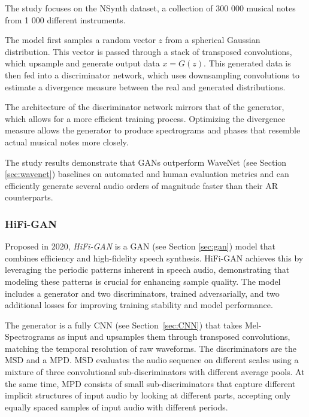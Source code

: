 The study focuses on the NSynth \cite{engel_neural_2017} dataset, a collection of 300 000 musical notes from 1 000 different instruments.

The model first samples a random vector $z$ from a spherical Gaussian distribution. This vector is passed through a stack of transposed convolutions, which upsample and generate output data $x = G(z)$. This generated data is then fed into a discriminator network, which uses downsampling convolutions to estimate a divergence measure between the real and generated distributions.

The architecture of the discriminator network mirrors that of the generator, which allows for a more efficient training process. Optimizing the divergence measure allows the generator to produce spectrograms and phases that resemble actual musical notes more closely.

The study results demonstrate that \acp{GAN} outperform WaveNet (see Section \ref{sec:wavenet}) baselines on automated and human evaluation metrics and can efficiently generate several audio orders of magnitude faster than their \ac{AR} counterparts.


\subsubsection{HiFi-GAN}

Proposed in 2020, \textit{HiFi-GAN} \cite{kong_hifi-gan_2020} is a \ac{GAN} (see Section \ref{sec:gan}) model that combines efficiency and high-fidelity speech synthesis. HiFi-GAN achieves this by leveraging the periodic patterns inherent in speech audio, demonstrating that modeling these patterns is crucial for enhancing sample quality. The model includes a generator and two discriminators, trained adversarially, and two additional losses for improving training stability and model performance.

The generator is a fully \ac{CNN} (see Section~\ref{sec:CNN}) that takes Mel-Spectrograms as input and upsamples them through transposed convolutions, matching the temporal resolution of raw waveforms. The discriminators are the \ac{MSD} and a \ac{MPD}. \Ac{MSD} evaluates the audio sequence on different scales using a mixture of three convolutional sub-discriminators with different average pools. At the same time, \ac{MPD} consists of small sub-discriminators that capture different implicit structures of input audio by looking at different parts, accepting only equally spaced samples of input audio with different periods. 

